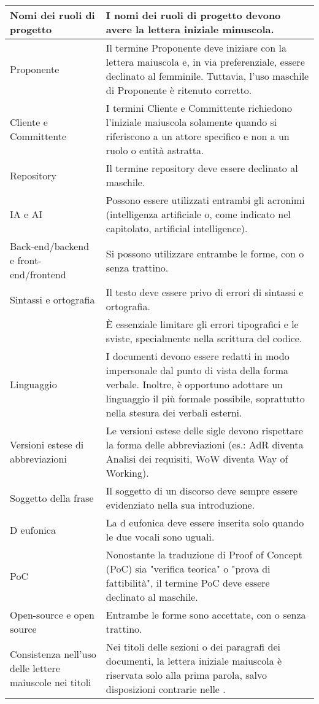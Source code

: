 \begin{adjustwidth}{-0.5cm}{-0.5cm}
\begin{longtable}{|P{4.5cm}|>{\raggedright\arraybackslash}P{9cm}|}
    Nomi dei ruoli di progetto & I nomi dei ruoli di progetto devono avere la lettera iniziale minuscola. \\
    \hline Proponente & Il termine Proponente deve iniziare con la lettera maiuscola e, in via preferenziale, essere declinato al femminile. Tuttavia, l'uso maschile di Proponente è ritenuto corretto.\\
    \hline Cliente e Committente & I termini Cliente e Committente richiedono l'iniziale maiuscola solamente quando si riferiscono a un attore specifico e non a un ruolo o entità astratta.\\
		\hline Repository & Il termine repository deve essere declinato al maschile.\\
    \hline IA e AI & Possono essere utilizzati entrambi gli acronimi (intelligenza artificiale o, come indicato nel capitolato, artificial intelligence).\\
    \hline Back-end/backend e front-end/frontend & Si possono utilizzare entrambe le forme, con o senza trattino.\\
    \hline Sintassi e ortografia & Il testo deve essere privo di errori di sintassi e ortografia. \\
    \hline {} & È essenziale limitare gli errori tipografici e le sviste, specialmente nella scrittura del codice. \\
    \hline Linguaggio & I documenti devono essere redatti in modo impersonale dal punto di vista della forma verbale. Inoltre, è opportuno adottare un linguaggio il più formale possibile, soprattutto nella stesura dei verbali esterni. \\
    \hline Versioni estese di abbreviazioni & Le versioni estese delle sigle devono rispettare la forma delle abbreviazioni (es.: AdR diventa Analisi dei requisiti, WoW diventa Way of Working). \\
		\hline Soggetto della frase & Il soggetto di un discorso deve sempre essere evidenziato nella sua introduzione. \\
		\hline D eufonica & La d eufonica deve essere inserita solo quando le due vocali sono uguali. \\
		\hline PoC & Nonostante la traduzione di Proof of Concept (PoC) sia "verifica teorica" o "prova di fattibilità", il termine PoC deve essere declinato al maschile. \\
		\hline Open-source e open source & Entrambe le forme sono accettate, con o senza trattino. \\
		\hline Consistenza nell'uso delle lettere maiuscole nei titoli & Nei titoli delle sezioni o dei paragrafi dei documenti, la lettera iniziale maiuscola è riservata solo alla prima parola, salvo disposizioni contrarie nelle \NdP. \\

\end{longtable}
\end{adjustwidth}

